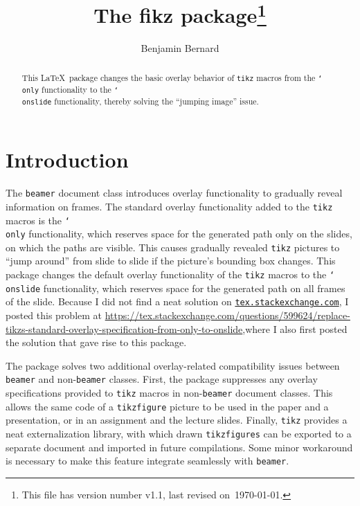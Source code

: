 \documentclass{article}
\title{\vspace{-7mm}The \textsf{fikz} package\footnote{This file has version number v1.1, last revised on~\today.}}
\author{Benjamin Bernard}
\renewcommand{\textbackslash}{\char`\\}
\def\cmd#1{\texttt{\color{cmd}\textbackslash#1}}
\begin{document}
\maketitle

\vspace{-1mm}
\begin{abstract}
This \LaTeX\ package changes the basic overlay behavior of \texttt{tikz} macros from the \cmd{only} functionality to the \cmd{onslide} functionality, thereby solving the ``jumping image'' issue.
\end{abstract}

\section{Introduction}

The \texttt{beamer} document class introduces overlay functionality to gradually reveal information on frames. The standard overlay functionality added to the \texttt{tikz} macros is the \cmd{only} functionality, which reserves space for the generated path only on the slides, on which the paths are visible. This causes gradually revealed \texttt{tikz} pictures to ``jump around'' from slide to slide if the picture's bounding box changes. This package changes the default overlay functionality of the \texttt{tikz} macros to the \cmd{onslide} functionality, which reserves space for the generated path on all frames of the slide. Because I did not find a neat solution on \href{https://tex.stackexchange.com}{\texttt{tex.stackexchange.com}}, I posted this problem at \url{https://tex.stackexchange.com/questions/599624/replace-tikzs-standard-overlay-specification-from-only-to-onslide},\linebreak where I also first posted the solution that gave rise to this package.


The package solves two additional overlay-related compatibility issues between \texttt{beamer} and non-\texttt{beamer} classes. First, the package suppresses any overlay specifications provided to \texttt{tikz} macros in non-\texttt{beamer} document classes. This allows the same code of a \texttt{tikzfigure} picture to be used in the paper and a presentation, or in an assignment and the lecture slides. Finally, \texttt{tikz} provides a neat externalization library, with which drawn \texttt{tikzfigures} can be exported to a separate document and imported in future compilations. Some minor workaround is necessary to make this feature integrate seamlessly with \texttt{beamer}.
\end{document}
